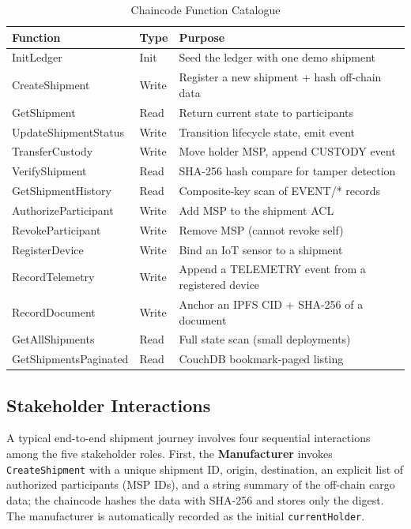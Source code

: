 \documentclass[conference]{IEEEtran}
\begin{document}
\begin{table}[!t]
\caption{Chaincode Function Catalogue}
\label{tab:funcs}
\centering
\footnotesize
\renewcommand{\arraystretch}{1.1}
\begin{tabularx}{\columnwidth}{@{}l l X@{}}
\toprule
\textbf{Function} & \textbf{Type} & \textbf{Purpose} \\
\midrule
InitLedger              & Init   & Seed the ledger with one demo shipment \\
CreateShipment          & Write  & Register a new shipment + hash off-chain data \\
GetShipment             & Read   & Return current state to participants \\
UpdateShipmentStatus    & Write  & Transition lifecycle state, emit event \\
TransferCustody         & Write  & Move holder MSP, append CUSTODY event \\
VerifyShipment          & Read   & SHA-256 hash compare for tamper detection \\
GetShipmentHistory      & Read   & Composite-key scan of EVENT/* records \\
AuthorizeParticipant    & Write  & Add MSP to the shipment ACL \\
RevokeParticipant       & Write  & Remove MSP (cannot revoke self) \\
RegisterDevice          & Write  & Bind an IoT sensor to a shipment \\
RecordTelemetry         & Write  & Append a TELEMETRY event from a registered device \\
RecordDocument          & Write  & Anchor an IPFS CID + SHA-256 of a document \\
GetAllShipments         & Read   & Full state scan (small deployments) \\
GetShipmentsPaginated   & Read   & CouchDB bookmark-paged listing \\
\bottomrule
\end{tabularx}
\end{table}

\subsection{Stakeholder Interactions}

A typical end-to-end shipment journey involves four sequential
interactions among the five stakeholder roles.  First, the
\textbf{Manufacturer} invokes \texttt{CreateShipment} with a unique
shipment ID, origin, destination, an explicit list of authorized
participants (MSP IDs), and a string summary of the off-chain cargo data;
the chaincode hashes the data with SHA-256 and stores only the digest.
The manufacturer is automatically recorded as the initial \texttt{currentHolder}.
\end{document}
